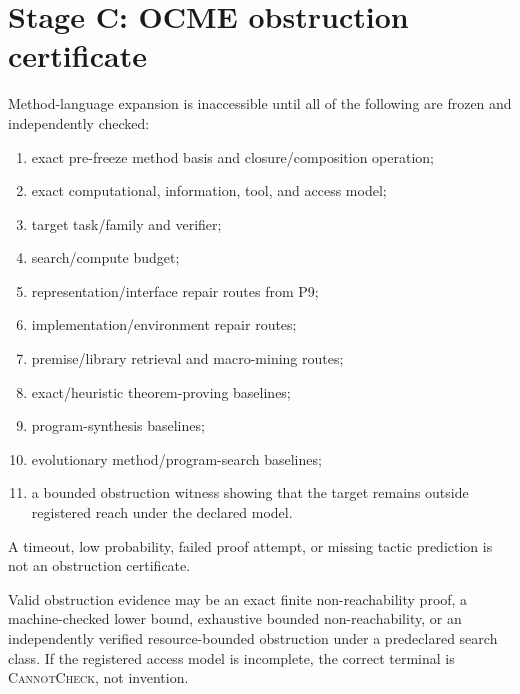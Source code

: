 \section{Stage C: OCME obstruction certificate}
Method-language expansion is inaccessible until all of the following are frozen and independently checked:
\begin{enumerate}
    \item exact pre-freeze method basis and closure/composition operation;
    \item exact computational, information, tool, and access model;
    \item target task/family and verifier;
    \item search/compute budget;
    \item representation/interface repair routes from P9;
    \item implementation/environment repair routes;
    \item premise/library retrieval and macro-mining routes;
    \item exact/heuristic theorem-proving baselines;
    \item program-synthesis baselines;
    \item evolutionary method/program-search baselines;
    \item a bounded obstruction witness showing that the target remains outside registered reach under the declared model.
\end{enumerate}
A timeout, low probability, failed proof attempt, or missing tactic prediction is not an obstruction certificate.

Valid obstruction evidence may be an exact finite non-reachability proof, a machine-checked lower bound, exhaustive bounded non-reachability, or an independently verified resource-bounded obstruction under a predeclared search class. If the registered access model is incomplete, the correct terminal is \textsc{CannotCheck}, not invention.

